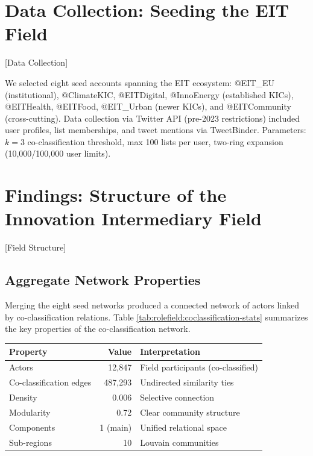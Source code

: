 \documentclass[../main.tex]{subfiles}
\begin{document}
\section{Data Collection: Seeding the EIT Field}[Data Collection]

We selected eight seed accounts spanning the EIT ecosystem: @EIT\_EU (institutional), @ClimateKIC, @EITDigital, @InnoEnergy (established KICs), @EITHealth, @EITFood, @EIT\_Urban (newer KICs), and @EITCommunity (cross-cutting). Data collection via Twitter API (pre-2023 restrictions) included user profiles, list memberships, and tweet mentions via TweetBinder. Parameters: $k = 3$ co-classification threshold, max 100 lists per user, two-ring expansion (10,000/100,000 user limits).


\section{Findings: Structure of the Innovation Intermediary Field}[Field Structure]

\subsection{Aggregate Network Properties}

Merging the eight seed networks produced a connected network of actors linked by co-classification relations. Table \ref{tab:rolefield:coclassification-stats} summarizes the key properties of the co-classification network.

\begin{center}
\small
\begin{tabular}{lrl}
\toprule
\textbf{Property} & \textbf{Value} & \textbf{Interpretation} \\
\midrule
Actors & 12,847 & Field participants (co-classified) \\
Co-classification edges & 487,293 & Undirected similarity ties \\
Density & 0.006 & Selective connection \\
Modularity & 0.72 & Clear community structure \\
Components & 1 (main) & Unified relational space \\
Sub-regions & 10 & Louvain communities \\
\bottomrule
\end{tabular}
\end{center}
\end{document}
